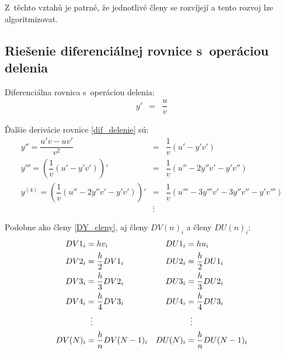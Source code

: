 Z~těchto vztahů je patrné, že jednotlivé členy se rozvíjejí a tento rozvoj lze algoritmizovat.\\ 
%


\subsection{Riešenie diferenciálnej rovnice s~operáciou delenia} \label{priloha_delenie}

Diferenciálna rovnica s~operáciou delenia:
\begin{eqnarray}
y' & = & \dfrac{u}{v}
\end{eqnarray}

Ďalšie derivácie rovnice \eqref{dif_delenie} sú:
\begin{eqnarray}
y'' = \dfrac{u'v - uv'}{v^{2}} & = & \dfrac{1}{v} (u' - y'v') \label{priloha_derivacie_delenie} \\
y''' = \left( \dfrac{1}{v} (u' - y'v') \right)' & = & \dfrac{1}{v} (u'' - 2y''v' - y'v'') \nonumber \\
y^{(4)} = \left( \dfrac{1}{v} (u'' - 2y''v' - y'v') \right)' & = & \dfrac{1}{v} (u''' - 3y'''v' - 3y''v'' - y'v''') \nonumber \\
 & \vdots \nonumber &
\end{eqnarray}


Podobne ako členy \ref{DY_cleny}, aj členy $ DV(n)_{i} $ a členy $ DU(n)_{i} $:
\begin{align}
DV1_{i} &= h v_{i}					& DU1_{i} &= h u_{i} \ \\ 
DV2_{i} &= \dfrac{h}{2} DV1_{i} 	& DU2_{i} &= \dfrac{h}{2} DU1_{i} \nonumber \\
DV3_{i} &= \dfrac{h}{3} DV2_{i} 	& DU3_{i} &= \dfrac{h}{3} DU2_{i} \nonumber \\
DV4_{i} &= \dfrac{h}{4} DV3_{i} 	& DU4_{i} &= \dfrac{h}{4} DU3_{i} \nonumber \\
&\hspace{2mm}\vdots					& &\hspace{2mm}\vdots \nonumber \\
DV(N)_{i} &= \dfrac{h}{n} DV(N-1)_{i} & DU(N)_{i} &= \dfrac{h}{n} DU(N-1)_{i} \nonumber
\end{align}

